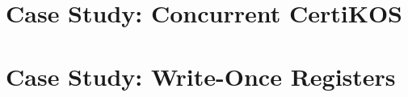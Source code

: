 \documentclass[letterpaper,11pt]{yalephd}
\begin{document}




%
%
%
%
%   
%   
%    



\chapter{Case Study: Concurrent CertiKOS}
\label{chapter:concurrent-certikos}







%    
%    
%
%
%
%
%
%
%
%




\chapter{Case Study: Write-Once Registers}
\label{chapter:wormspace}




%
%

%
%
%
%
%
%
\end{document}
